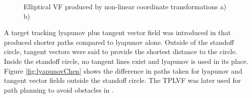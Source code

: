 \documentclass[numbered,pdftex]{ohio-etd}
\begin{document}
\begin{figure}[h]
	\begin{subfigmatrix}{2}%
		\centering
	\end{subfigmatrix}
	\caption{Elliptical VF produced by non-linear coordinate transformations a)\cite{frew_lyapunov_nodate} b)\cite{frew_cooperative_2007}}
	\label{fig:lyapunovFrew}
\end{figure}

A target tracking lyapunov plus tangent vector field was introduced in \cite{chen_tracking_2009} that produced shorter paths compared to lyapunov alone. Outside of the standoff circle, tangent vectors were said to provide the shortest distance to the circle. Inside the standoff circle, no tangent lines exist and lyapunov is used in its place. Figure \ref{fig:lyapunovChen} shows the difference in paths taken for lyapunov and tangent vector fields outside the standoff circle. The TPLVF was later used for path planning to avoid obstacles in \cite{chen_uav_2013}.
\end{document}

